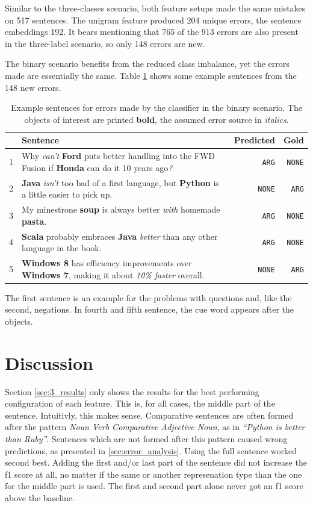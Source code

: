 Similar to the three-classes scenario, both feature setups made the same mistakes on 517 sentences. The unigram feature produced 204 unique errors, the sentence embeddings 192. It bears mentioning that 765 of the 913 errors are also present in the three-label scenario, so only 148 errors are new. 


The binary scenario benefits from the reduced class imbalance, yet the errors made are essentially the same. Table \ref{tbl:2_mistakes} shows some example sentences from the 148 new errors.

\begin{table}[h]
\caption{Example sentences for errors made by the classifier in the binary scenario. The objects of interest are printed \textbf{bold}, the assumed error source in \emph{italics}.}
\label{tbl:2_mistakes}
\begin{tabularx}{\linewidth}{lXrr}
\toprule
 & Sentence & Predicted & Gold \\ \midrule
1 & Why \emph{can't} \textbf{Ford} puts better handling into the FWD Fusion if \textbf{Honda} can do it 10 years ago\emph{?} & \texttt{ARG} & \texttt{NONE}\\
2 & \textbf{Java} \emph{isn't} too bad of a first language, but \textbf{Python} is a little easier to pick up. & \texttt{NONE} & \texttt{ARG} \\
3 & My minestrone \textbf{soup} is always better \emph{with} homemade \textbf{pasta}. & \texttt{ARG} & \texttt{NONE} \\
4 & \textbf{Scala} probably embraces \textbf{Java} \emph{better} than any other language in the book. & \texttt{ARG} & \texttt{NONE} \\
5 & \textbf{Windows 8} has efficiency improvements over \textbf{Windows 7}, making it about \emph{10\% faster} overall. & \texttt{NONE} & \texttt{ARG} \\
\bottomrule
\end{tabularx}

\end{table}

The first sentence is an example for the problems with questions and, like the second, negations. In fourth and fifth sentence, the cue word appears after the objects.
\FloatBarrier
\section{Discussion}
Section \ref{sec:3_results} only shows the results for the best performing configuration of each feature. This is, for all cases, the middle part of the sentence. Intuitivly, this makes sense. Comparative sentences are often formed after the pattern \emph{Noun Verb Comparative Adjective Noun}, as in \emph{\enquote{Python is better than Ruby}}. Sentences which are not formed after this pattern caused wrong predictions, as presented in \ref{sec:error_analysis}.
 Using the full sentence worked second best. Adding the first and/or last part of the sentence did not increase the f1 score at all, no matter if the same or another represenation type than the one for the middle part is used. The first and second part alone never got an f1 score above the baseline.


